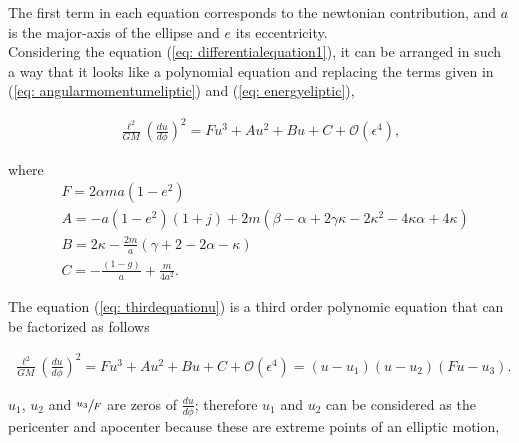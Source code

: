 The first term in each equation corresponds to the newtonian contribution, and $a$ is the major-axis of the ellipse and $e$ its eccentricity.\\

Considering the equation (\ref{eq: differentialequation1}), it can be arranged in such a way that it looks like a polynomial equation and replacing the terms given in (\ref{eq: angularmomentumeliptic}) and (\ref{eq: energyeliptic}),

\begin{align}
\label{eq: thirdequationu}
	\frac{\ell^2}{GM}\left(\frac{du}{d\phi}\right)^2 = Fu^3 + Au^2 +Bu+C +\mathcal{O}(\epsilon^4),
\end{align}

where
\begin{subequations}
\label{eq: coefficientsFABC}
\begin{align}
	&F = 2\alpha m a(1-e^2)\\
	&A = -a(1-e^2)(1+j)+2m(\beta - \alpha + 2\gamma\kappa - 2\kappa^2 - 4\kappa\alpha+4\kappa)\\
	&B = 2\kappa - \frac{2m}{a}(\gamma+2-2\alpha-\kappa)\\
	&C = -\frac{(1-g)}{a}+\frac{m}{4a^2}.
\end{align}
\end{subequations}

The equation (\ref{eq: thirdequationu}) is a third order polynomic equation that can be factorized as follows

\begin{align}
\label{eq: factorizacion}
\frac{\ell^2}{GM}\left(\frac{du}{d\phi}\right)^2 = Fu^3 + Au^2 +Bu+C +\mathcal{O}(\epsilon^4) = (u-u_1)(u-u_2)(Fu-u_3).
\end{align}

$u_1$, $u_2$ and $\sfrac{u_3}{F}$ are zeros of $\frac{du}{d\phi}$; therefore $u_1$ and $u_2$ can be considered as the pericenter and apocenter because these are extreme points of an elliptic motion,

